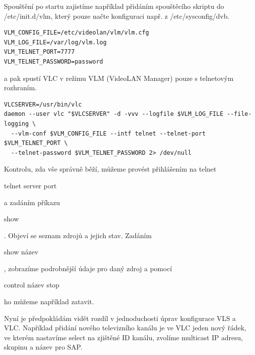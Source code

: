 \vspace{10pt}

Spouštění po startu zajistíme například přidáním spouštěcího skriptu do /etc/init.d/vlm, který pouze načte konfiguraci např. z /etc/sysconfig/dvb.

\vspace{10pt}

\begin{small}
\begin{verbatim}
VLM_CONFIG_FILE=/etc/videolan/vlm/vlm.cfg
VLM_LOG_FILE=/var/log/vlm.log
VLM_TELNET_PORT=7777
VLM_TELNET_PASSWORD=password
\end{verbatim}
\end{small}

\vspace{10pt}

a pak spustí VLC v režimu VLM (VideoLAN Manager) pouze s telnetovým rozhraním.

\vspace{10pt}

\begin{small}
\begin{verbatim}
VLCSERVER=/usr/bin/vlc
daemon --user vlc "$VLCSERVER" -d -vvv --logfile $VLM_LOG_FILE --file-logging \
  --vlm-conf $VLM_CONFIG_FILE --intf telnet --telnet-port $VLM_TELNET_PORT \
  --telnet-password $VLM_TELNET_PASSWORD 2> /dev/null
\end{verbatim}
\end{small}

\vspace{10pt}

Kontrolu, zda vše správně běží, můžeme provést přihlášením na telnet \begin{small}telnet server port\end{small} a zadáním příkazu \begin{small}show\end{small}. Objeví se seznam zdrojů a jejich stav. Zadáním \begin{small}show název\end{small}, zobrazíme podrobnější údaje pro daný zdroj a pomocí \begin{small}control název stop\end{small} ho můžeme například zatavit.

\vspace{10pt}

Nyní je předpokládám vidět rozdíl v jednoduchosti úprav konfigurace VLS a VLC. Například přidání nového televizního kanálu je ve VLC jeden nový řádek, ve kterém nastavíme select na zjištěné ID kanálu, zvolíme multicast IP adresu, skupinu a název pro SAP.

